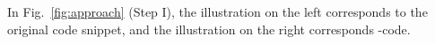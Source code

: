 In Fig.~\ref{fig:approach} (Step I), the illustration on the left corresponds to the original code snippet, and the illustration on the right corresponds \code{[blank]}-code.



